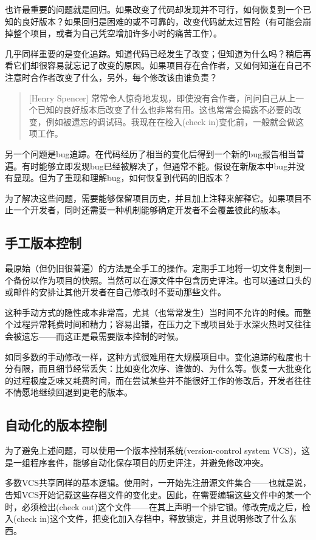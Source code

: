 \documentclass[12pt,oneside]{book}
\begin{document}
\begin{common-format}
也许最重要的问题就是回归。如果改变了代码却发现并不可行，如何恢复到一个已知的良好版本？如果回归是困难的或不可靠的，改变代码就太过冒险（有可能会崩掉整个项目，或者为自己凭空增加许多小时的痛苦工作）。

几乎同样重要的是变化追踪。知道代码已经发生了改变；但知道为什么吗？稍后再看它们却很容易就忘记了改变的原因。如果项目存在合作者，又如何知道在自己不注意时合作者改变了什么，另外，每个修改该由谁负责？

\begin{quote}[Henry Spencer]
常常令人惊奇地发现，即使没有合作者，问问自己从上一个已知的良好版本后改变了什么也非常有用。这也常常会揭露不必要的改变，例如被遗忘的调试码。我现在在检入(check in)变化前，一般就会做这项工作。
\end{quote}

另一个问题是bug追踪。在代码经历了相当的变化后得到一个新的bug报告相当普遍。有时能够立即发现bug已经被解决了，但通常不能。假设在新版本中bug并没有显现。但为了重现和理解bug，如何恢复到代码的旧版本？

为了解决这些问题，需要能够保留项目历史，并且加上注释来解释它。如果项目不止一个开发者，同时还需要一种机制能够确定开发者不会覆盖彼此的版本。

\subsection{手工版本控制}
最原始（但仍旧很普遍）的方法是全手工的操作。定期手工地将一切文件复制到一个备份以作为项目的快照。当然可以在源文件中包含历史评注。也可以通过口头的或邮件的安排让其他开发者在自己修改时不要动那些文件。

这种手动方式的隐性成本非常高，尤其（也常常发生）当时间不允许的时候。而整个过程异常耗费时间和精力；容易出错，在压力之下或项目处于水深火热时又往往会被遗忘——而这正是最需要版本控制的时候。

如同多数的手动修改一样，这种方式很难用在大规模项目中。变化追踪的粒度也十分有限，而且细节经常丢失：比如变化次序、谁做的、为什么等。恢复一大批变化的过程极度乏味又耗费时间，而在尝试某些并不能很好工作的修改后，开发者往往不情愿地继续回退到更老的版本。


\subsection{自动化的版本控制}
为了避免上述问题，可以使用一个版本控制系统(version-control system VCS)，这是一组程序套件，能够自动化保存项目的历史评注，并避免修改冲突。

多数VCS共享同样的基本逻辑。使用时，一开始先注册源文件集合——也就是说，告知VCS开始记载这些存档文件的变化史。因此，在需要编辑这些文件中的某一个时，必须检出(check out)这个文件——在其上声明一个排它锁。修改完成之后，检入(check in)这个文件，把变化加入存档中，释放锁定，并且说明修改了什么东西。


\end{common-format}
\end{document}
